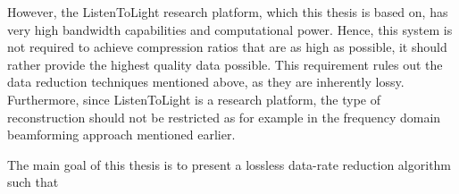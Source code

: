 
However, the ListenToLight research platform, which this thesis is based on, has very high bandwidth capabilities and computational power. Hence, this system is not required to achieve compression ratios that are as high as possible, it should rather provide the highest quality data possible. This requirement rules out the data reduction techniques mentioned above, as they are inherently lossy. Furthermore, since ListenToLight is a research platform, the type of reconstruction should not be restricted as for example in the frequency domain beamforming approach mentioned earlier.

The main goal of this thesis is to present a lossless data-rate reduction algorithm such that 





